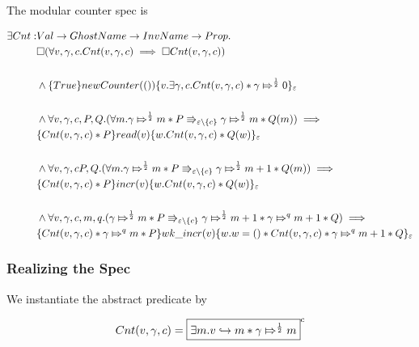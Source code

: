 The modular counter spec is 

\begin{align*}
\exists Cnt : & Val \rightarrow GhostName \rightarrow InvName \rightarrow Prop.\\
& \pemod{ ( \forall v, \gamma, c. \Cnt{v}{\gamma}{c} \implies \pemod{ \Cnt{v}{\gamma}{c} } ) } \\
\\
& \land \hot{True}{ newCounter(())}{v. \exists \gamma, c. \Cnt{v}{\gamma}{c} * \apointsto{\gamma}{0}{\frac{1}{2}}}_{\varepsilon} \\
\\
&  \land \forall v, \gamma, c, P, Q. (\forall m. \apointsto{\gamma}{m}{\frac{1}{2}} * P \Rrightarrow_{\varepsilon \backslash \{c\}} \apointsto{\gamma}{m}{\frac{1}{2}} * Q(m) ) \implies \\
& \hot{\Cnt{v}{\gamma}{c} * P}{read(v)}{w. \Cnt{v}{\gamma}{c} * Q(w)}_\varepsilon \\
\\
& \land \forall v, \gamma, c P, Q. (\forall m. \apointsto{\gamma}{m}{\frac{1}{2}} * P \Rrightarrow_{\varepsilon \backslash \{c\}} \apointsto{\gamma}{m + 1}{\frac{1}{2}} * Q(m)) \implies \\
& \hot{\Cnt{v}{\gamma}{c} * P}{incr(v)}{w. \Cnt{v}{\gamma}{c} * Q(w)}_{\varepsilon} \\
\\
& \land \forall v, \gamma, c, m, q.  (\apointsto{\gamma}{m}{\frac{1}{2}} * P \Rrightarrow_{\varepsilon \backslash \{ c \}} \apointsto{\gamma}{m + 1}{\frac{1}{2}} * \apointsto{\gamma}{m + 1}{q} * Q) \implies \\
& \hot{\Cnt{v}{\gamma}{c} * \apointsto{\gamma}{m}{q}  * P}{wk\_incr(v)}{w. w = () * \Cnt{v}{\gamma}{c} * \apointsto{\gamma}{m + 1}{q} * Q}_{\varepsilon}
\end{align*}

\subsubsection{Realizing the Spec}

We instantiate the abstract predicate by

\[
\Cnt{v}{\gamma}{c} = \invm{\exists m. \pointsto{v}{m} * \apointsto{\gamma}{m}{\frac{1}{2}}}{c}
\] 

